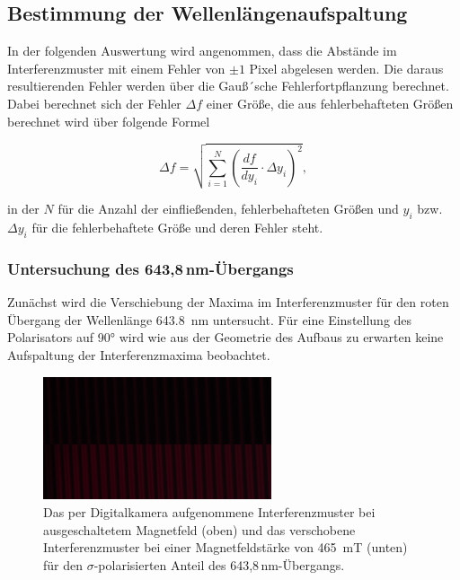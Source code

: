         \FloatBarrier

    \newpage
    \subsection{Bestimmung der Wellenlängenaufspaltung}
        In der folgenden Auswertung wird angenommen, dass die Abstände im Interferenzmuster mit einem Fehler von $\pm 1$ Pixel abgelesen werden. Die daraus resultierenden Fehler werden über die Gauß´sche
        Fehlerfortpflanzung berechnet. Dabei berechnet sich der Fehler $\Delta f$ einer Größe, die aus fehlerbehafteten Größen berechnet wird über folgende Formel
        
        \begin{equation*}
          \Delta f = \sqrt{\sum_{i=1}^N (\frac{df}{dy_i}\cdot \Delta y_i)^2},
        \end{equation*}

        in der $N$ für die Anzahl der einfließenden, fehlerbehafteten Größen und $y_i$ bzw. $\Delta y_i$ für die fehlerbehaftete Größe und deren Fehler steht.

        \subsubsection*{Untersuchung des 643,8\,nm-Übergangs}
            Zunächst wird die Verschiebung der Maxima im Interferenzmuster für den roten Übergang der Wellenlänge \SI{643.8}{\nano\metre} untersucht. Für eine Einstellung des Polarisators auf 90° wird wie aus
            der Geometrie des Aufbaus zu erwarten keine Aufspaltung der Interferenzmaxima beobachtet.

            \FloatBarrier

            \begin{figure}[h]
              \centering
              \includegraphics[width = 0.6\textwidth]{pictures/rot_sigma.png}
              \caption{Das per Digitalkamera aufgenommene Interferenzmuster bei ausgeschaltetem Magnetfeld (oben) und das verschobene Interferenzmuster bei einer Magnetfeldstärke von \SI{465}{\milli\tesla} (unten) für den $\sigma$-polarisierten Anteil des 643,8\,nm-Übergangs.}
              \label{fig:rot_sigma}
            \end{figure}
        
